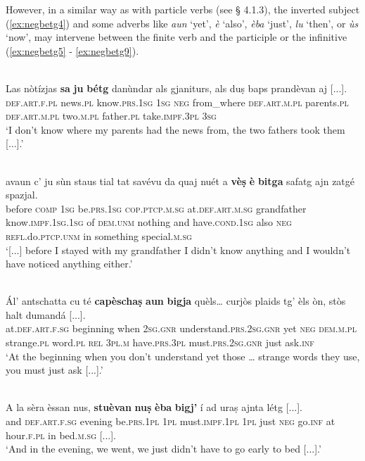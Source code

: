 However, in a similar way as with particle verbs (see § 4.1.3), the inverted subject (\ref{ex:negbetg4}) and some adverbs like \textit{aun} `yet', \textit{è} `also', \textit{èba} `just', \textit{lu} `then', or \textit{ùs} `now', may intervene between the finite verb and the participle or the infinitive (\ref{ex:negbetg5} - \ref{ex:negbetg9}).

\ea
\label{ex:negbetg4}
\\
\gll Las nòtízjas \textbf{sa} \textbf{ju} \textbf{bétg} danùndar als gjaniturs, als duṣ baps prandèvan aj [...]. \\
\textsc{def.art.f.pl} news.\textsc{pl} know.\textsc{prs.1sg} \textsc{1sg} \textsc{neg} from\_where \textsc{def.art.m.pl} parents.\textsc{pl} \textsc{def.art.m.pl} two.\textsc{m.pl} father.\textsc{pl} take.\textsc{impf.3pl} \textsc{3sg}\\
\glt `I don’t know where my parents had the news from, the two fathers took them [...].'
\z

\ea
\label{ex:negbetg5}
\\
\gll  [...] avaun c’ ju sùn staus tial tat savévu da quaj nuét a \textbf{vèṣ} \textbf{è} \textbf{bitga} safatg ajn zatgé spazjal.  \\
{} before \textsc{comp} \textsc{1sg} be.\textsc{prs.1sg} \textsc{cop.ptcp.m.sg} at.\textsc{def.art.m.sg} grandfather know.\textsc{impf.1sg.1sg} of \textsc{dem.unm} nothing and have.\textsc{cond.1sg} also \textsc{neg} \textsc{refl.}do.\textsc{ptcp.unm} in something special.\textsc{m.sg}\\
\glt `[...] before I stayed with my grandfather I didn’t know anything and I wouldn’t have noticed anything either.'
\z

\ea
\label{ex:negbetg6}
\\
\gll    Ál’ antschatta cu té \textbf{capèschaṣ} \textbf{aun} \textbf{bigja} quèls… curjòs plaids tg’ èls òn, stòs halt dumandá [...].\\
at.\textsc{def.art.f.sg} beginning when \textsc{2sg.gnr} understand.\textsc{prs.2sg.gnr} yet \textsc{neg} \textsc{dem.m.pl} strange.\textsc{pl} word.\textsc{pl} \textsc{rel} \textsc{3pl.m} have.\textsc{prs.3pl} must.\textsc{prs.2sg.gnr} just ask.\textsc{inf}\\
\glt `At the beginning when you don’t understand yet those … strange words they use, you must just ask [...].'
\z

\ea
\label{ex:negbetg7}
\\
\gll    A la sèra èssan nus, \textbf{stuèvan} \textbf{nuṣ} \textbf{èba} \textbf{bigj’} í ad uraṣ ajnta létg [...].\\
and \textsc{def.art.f.sg} evening be.\textsc{prs.1pl} \textsc{1pl} must.\textsc{impf.1pl} \textsc{1pl} just \textsc{neg} go.\textsc{inf} at hour.\textsc{f.pl} in  bed.\textsc{m.sg} [...].\\
\glt `And in the evening, we went, we just didn’t have to go early to bed [...].'
\z

